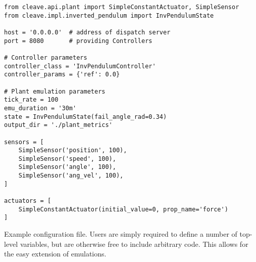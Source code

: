 \begin{listing}
    \begin{verbatim}
from cleave.api.plant import SimpleConstantActuator, SimpleSensor
from cleave.impl.inverted_pendulum import InvPendulumState

host = '0.0.0.0'  # address of dispatch server
port = 8080       # providing Controllers

# Controller parameters
controller_class = 'InvPendulumController'
controller_params = {'ref': 0.0}

# Plant emulation parameters 
tick_rate = 100
emu_duration = '30m'
state = InvPendulumState(fail_angle_rad=0.34)
output_dir = './plant_metrics'

sensors = [
    SimpleSensor('position', 100),
    SimpleSensor('speed', 100),
    SimpleSensor('angle', 100),
    SimpleSensor('ang_vel', 100),
]

actuators = [
    SimpleConstantActuator(initial_value=0, prop_name='force')
]
    \end{verbatim}
    \caption{
        Example configuration file.
        Users are simply required to define a number of top-level variables, but are otherwise free to include arbitrary code.
        This allows for the easy extension of emulations.
    }
    \label{lst:config}
\end{listing}
